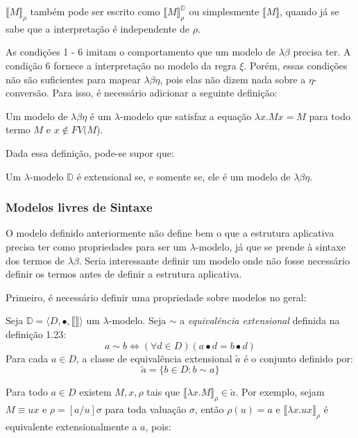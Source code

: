 \documentclass[../main.tex]{subfiles}
\begin{document}
$\llbracket M \rrbracket_{\rho}$ também pode ser escrito como $\llbracket M \rrbracket_{\rho}^{\mathbb{D}}$ ou simplesmente 
$\llbracket M \rrbracket$, quando já se sabe que a interpretação é independente de $\rho$.

As condições 1 - 6 imitam o comportamento que um modelo de $\lambda\beta$ precisa ter. A condição 6 fornece a interpretação no modelo da regra $\xi$. Porém, essas condições não são suficientes para mapear $\lambda\beta\eta$, pois elas não dizem nada sobre a $\eta$-conversão. Para isso, é necessário adicionar a seguinte definição:

\begin{definition}
    Um modelo de $\lambda\beta\eta$ é um $\lambda$-modelo que satisfaz a equação $\lambda x . Mx = M$ para todo termo $M$ e $x \not\in FV(M$).
\end{definition}

Dada essa definição, pode-se supor que:

\begin{theorem}
    Um $\lambda$-modelo $\mathbb{D}$ é extensional se, e somente se, ele é um modelo de $\lambda\beta\eta$.
\end{theorem}

\subsubsection{Modelos livres de Sintaxe}

O modelo definido anteriormente não define bem o que a estrutura aplicativa precisa ter como propriedades para ser um $\lambda$-modelo, já que se prende à sintaxe dos termos de $\lambda\beta$. Seria interessante definir um modelo onde não fosse necessário definir os termos antes de definir a estrutura aplicativa.

Primeiro, é necessário definir uma propriedade sobre modelos no geral:

\begin{definition}
    Seja $\mathbb{D} = \langle D, \bullet, \llbracket \rrbracket \rangle$ um $\lambda$-modelo. Seja $\sim$ a \emph{equivalência extensional} definida na definição 1.23: $$a \sim b \Longleftrightarrow (\forall d \in D)(a \bullet d = b \bullet d)$$
    Para cada $a \in D$, a classe de equivalência extensional $\tilde{a}$ é o conjunto definido por: $$\tilde{a} = \{b \in D : b \sim a \}$$
\end{definition}

Para todo $a \in D$ existem $M, x, \rho$ tais que $\llbracket \lambda x . M \rrbracket_{\rho} \in \tilde{a}$. Por exemplo, sejam $M \equiv ux$ e $\rho = [a/u]\sigma$ para toda valuação $\sigma$, então $\rho(u) = a$ e $\llbracket \lambda x . ux \rrbracket_{\rho}$ é equivalente extensionalmente a $a$, pois:
\end{document}
